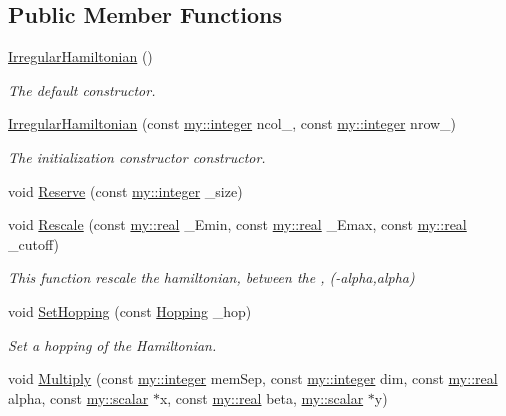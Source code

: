 \subsection*{Public Member Functions}
\begin{DoxyCompactItemize}
\item 
\hyperlink{classIrregularHamiltonian_a92dea0ba1bf2d3aa4ad1b77656faf0c1}{Irregular\+Hamiltonian} ()
\begin{DoxyCompactList}\small\item\em The default constructor. \end{DoxyCompactList}\item 
\hyperlink{classIrregularHamiltonian_a483ff008316f96f2ab4f956c472f37c8}{Irregular\+Hamiltonian} (const \hyperlink{namespacemy_a42365393c537edae1e89d20ff90d1923}{my\+::integer} ncol\+\_\+, const \hyperlink{namespacemy_a42365393c537edae1e89d20ff90d1923}{my\+::integer} nrow\+\_\+)
\begin{DoxyCompactList}\small\item\em The initialization constructor constructor. \end{DoxyCompactList}\item 
void \hyperlink{classIrregularHamiltonian_a9433ba6be0cd6b72793324200b32b461}{Reserve} (const \hyperlink{namespacemy_a42365393c537edae1e89d20ff90d1923}{my\+::integer} \+\_\+size)
\item 
void \hyperlink{classIrregularHamiltonian_a414ca4481117e4c90c32bccbc719dfaa}{Rescale} (const \hyperlink{namespacemy_ad61baeaeda728a4c48dd64f93e44a46c}{my\+::real} \+\_\+\+Emin, const \hyperlink{namespacemy_ad61baeaeda728a4c48dd64f93e44a46c}{my\+::real} \+\_\+\+Emax, const \hyperlink{namespacemy_ad61baeaeda728a4c48dd64f93e44a46c}{my\+::real} \+\_\+cutoff)
\begin{DoxyCompactList}\small\item\em This function rescale the hamiltonian, between the , (-\/alpha,alpha) \end{DoxyCompactList}\item 
void \hyperlink{classIrregularHamiltonian_a8ddcd83632d729d430253fa338a661a6}{Set\+Hopping} (const \hyperlink{classIrregularHamiltonian_ac7037c4beb0bd21bfa728132c3235b61}{Hopping} \+\_\+hop)
\begin{DoxyCompactList}\small\item\em Set a hopping of the Hamiltonian. \end{DoxyCompactList}\item 
void \hyperlink{classIrregularHamiltonian_a2d82fd0d2a739a66c67dff9e12aabd2a}{Multiply} (const \hyperlink{namespacemy_a42365393c537edae1e89d20ff90d1923}{my\+::integer} mem\+Sep, const \hyperlink{namespacemy_a42365393c537edae1e89d20ff90d1923}{my\+::integer} dim, const \hyperlink{namespacemy_ad61baeaeda728a4c48dd64f93e44a46c}{my\+::real} alpha, const \hyperlink{namespacemy_a12d9dde7e2fb58fbd11051705c382a86}{my\+::scalar} $\ast$x, const \hyperlink{namespacemy_ad61baeaeda728a4c48dd64f93e44a46c}{my\+::real} beta, \hyperlink{namespacemy_a12d9dde7e2fb58fbd11051705c382a86}{my\+::scalar} $\ast$y)

\end{DoxyCompactItemize}
